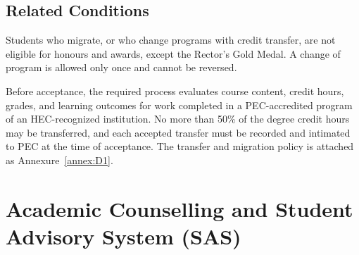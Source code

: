\subsection{Related Conditions}
Students who migrate, or who change programs with credit transfer, are not eligible for honours and awards, except the Rector's Gold Medal. A change of program is allowed only once and cannot be reversed.

\begin{sloppypar}
Before acceptance, the required process evaluates course content, credit hours, grades, and learning outcomes for work completed in a PEC-accredited program of an HEC-recognized institution. No more than 50\% of the degree credit hours may be transferred, and each accepted transfer must be recorded and intimated to PEC at the time of acceptance. The transfer and migration policy is attached as Annexure~\ref{annex:D1}.
\end{sloppypar}


\section{Academic Counselling and Student Advisory System (SAS)}
\label{sec:sas}




